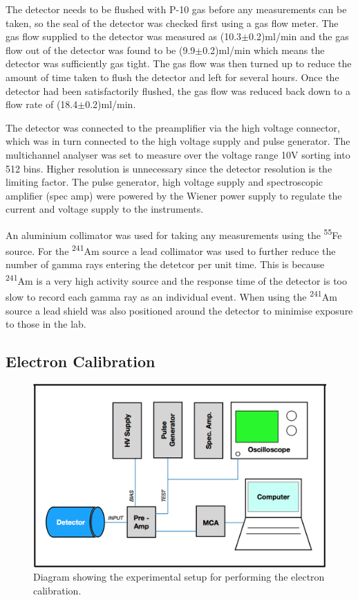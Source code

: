 The detector needs to be flushed with P-10 gas before any measurements can be taken, so the seal of the detector was checked first using a gas flow meter. The gas flow supplied to the detector was measured as (10.3$\pm$0.2)ml/min and the gas flow out of the detector was found to be (9.9$\pm$0.2)ml/min which means the detector was sufficiently gas tight. The gas flow was then turned up to reduce the amount of time taken to flush the detector and left for several hours. Once the detector had been satisfactorily flushed, the gas flow was reduced back down to a flow rate of (18.4$\pm$0.2)ml/min.

The detector was connected to the preamplifier via the high voltage connector, which was in turn connected to the high voltage supply and pulse generator. The multichannel analyser was set to measure over the voltage range 10V sorting into 512 bins. Higher resolution is unnecessary since the detector resolution is the limiting factor. The pulse generator, high voltage supply and spectroscopic amplifier (spec amp) were powered by the Wiener power supply to regulate the current and voltage supply to the instruments.

An aluminium collimator was used for taking any measurements using the \textsuperscript{55}Fe source. For the \textsuperscript{241}Am source a lead collimator was used to further reduce the number of gamma rays entering the detetcor per unit time. This is because \textsuperscript{241}Am is a very high activity source and the response time of the detector is too slow to record each gamma ray as an individual event. When using the \textsuperscript{241}Am source a lead shield was also positioned around the detector to minimise exposure to those in the lab.

\subsection{Electron Calibration}

\begin{figure}[h]
  \centering
  \includegraphics[width=\linewidth]{calibrationSchematic.png}
  \caption{Diagram showing the experimental setup for performing the electron calibration.}
  \label{fig:calibrationSetup}
\end{figure}

